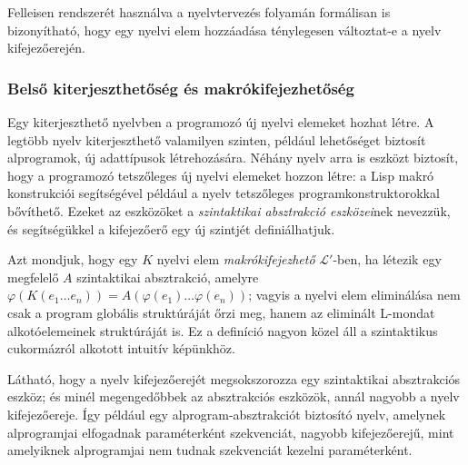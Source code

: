 Felleisen rendszerét használva a nyelvtervezés folyamán formálisan is bizonyítható, hogy egy nyelvi elem hozzáadása ténylegesen változtat-e a nyelv kifejezőerején.


\subsubsection{Belső kiterjeszthetőség és makrókifejezhetőség}
Egy kiterjeszthető nyelvben a programozó új nyelvi elemeket hozhat létre.
A legtöbb nyelv kiterjeszthető valamilyen szinten, például lehetőséget biztosít alprogramok, új adattípusok létrehozására.
Néhány nyelv arra is eszközt biztosít, hogy a programozó tetszőleges új nyelvi elemeket hozzon létre: a Lisp makró konstrukciói segítségével például a nyelv tetszőleges programkonstruktorokkal bővíthető.
Ezeket az eszközöket a \textit{szintaktikai absztrakció eszközei}nek nevezzük, és segítségükkel a kifejezőerő egy új szintjét definiálhatjuk.

Azt mondjuk, hogy egy $K$ nyelvi elem \textit{makrókifejezhető} $\mathcal{L}'$-ben, ha létezik egy megfelelő $A$ szintaktikai absztrakció, amelyre
$\varphi (K(e_1 \ldots e_n) ) = A(\varphi(e_1) \ldots \varphi(e_n))$; vagyis a nyelvi elem eliminálása nem csak a program globális struktúráját őrzi meg, hanem az eliminált L-mondat alkotóelemeinek struktúráját is\cite[3.11~definíció]{Felleisen90}. Ez a definíció nagyon közel áll a szintaktikus cukormázról alkotott intuitív képünkhöz.

Látható, hogy a nyelv kifejezőerejét megsokszorozza egy szintaktikai absztrakciós eszköz; és minél megengedőbbek az absztrakciós eszközök, annál nagyobb a nyelv kifejezőereje. Így például egy alprogram-absztrakciót biztosító nyelv, amelynek alprogramjai elfogadnak paraméterként szekvenciát, nagyobb kifejezőerejű, mint amelyiknek alprogramjai nem tudnak szekvenciát kezelni paraméterként. %


